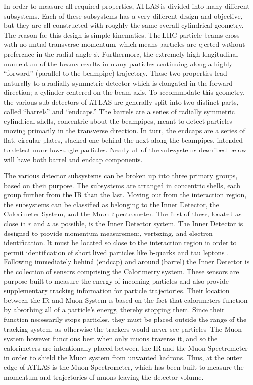     In order to measure all required properties, ATLAS is divided into many different subsystems.
    Each of these subsystems has a very different design and objective, but they are all constructed with roughly the same overall cylindrical geometry.
    The reason for this design is simple kinematics.
    The LHC particle beams cross with no initial transverse momentum, which means particles are ejected without preference in the radial angle $\phi$.
    Furthermore, the extremely high longitudinal momentum of the beams results in many particles continuing along a highly ``forward'' (parallel to the beampipe) trajectory.
    These two properties lead naturally to a radially symmetric detector which is elongated in the forward direction; a cylinder centered on the beam axis.
    To accommodate this geometry, the various sub-detectors of ATLAS are generally split into two distinct parts, called ``barrels'' and ``endcaps.''
    The barrels are a series of radially symmetric cylindrical shells, concentric about the beampipes, meant to detect particles moving primarily in the transverse direction.
    In turn, the endcaps are a series of flat, circular plates, stacked one behind the next along the beampipes,
        intended to detect more low-angle particles.
    Nearly all of the sub-systems described below will have both barrel and endcap components.

    The various detector subsystems can be broken up into three primary groups, based on their purpose.
    The subsystems are arranged in concentric shells, each group further from the IR than the last.
    Moving out from the interaction region, the subsystems can be classified as belonging to the Inner Detector, the Calorimeter System, and the Muon Spectrometer.
    The first of these, located as close in $r$ and $z$ as possible, is the Inner Detector system.
    The Inner Detector is designed to provide momentum measurement, vertexing, and electron identification.
    It must be located so close to the interaction region in order to permit identification
        of short lived particles like b-quarks and tau leptons \cite{id_tdr}.
    Following immediately behind (endcap) and around (barrel) the Inner Detector is the collection of sensors comprising the Calorimetry system.
    These sensors are purpose-built to measure the energy of incoming particles and also provide supplementary tracking information for particle trajectories.
    Their location between the IR and Muon System is based on the fact that calorimeters function by absorbing all of a particle's energy, thereby stopping them.
    Since their function necessarily stops particles, they must be placed outside the range of the tracking system, as otherwise the trackers would never see particles.
    The Muon system however functions best when only muons traverse it, and so the calorimeters are intentionally placed between the IR and the Muon Spectrometer in order to shield the Muon system from unwanted hadrons.
    Thus, at the outer edge of ATLAS is the Muon Spectrometer,
        which has been built to measure the momentum and trajectories of muons leaving the detector volume.

